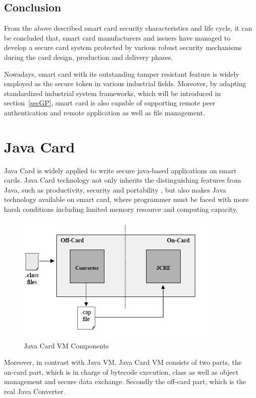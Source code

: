 \subsection {Conclusion}
From the above described smart card security characteristics and life cycle, it can be concluded that, smart card manufacturers and issuers have managed to develop a secure card system protected by various robust security mechanisms during the card design, production and delivery phases.

Nowadays, smart card with its outstanding tamper resistant feature is widely employed as the secure token in various industrial fields. Moreover, by adapting standardized industrial system frameworks, which will be introduced in section~\ref{secGP}, smart card is also capable of supporting remote peer authentication and remote application as well as file management.

\section{Java Card} \label{secJAVACARD}
Java Card is widely applied to write secure java-based applications on smart cards. Java Card technology not only inherits the distinguishing features from Java, such as productivity, security and portability \cite{jcadg}, but also makes Java technology available on smart card, where programmer must be faced with more harsh conditions including limited memory resource and computing capacity.

 \begin{figure}[!htb]
	\centering
	\includegraphics[width=0.9\textwidth]{jcvm.jpg}
		\caption{Java Card VM Components\cite{jcadg}}
	\label{fig:jcvm}
\end{figure}

Moreover, in contrast with Java VM, Java Card VM consists of two parts, the on-card part, which is in charge of bytecode execution, class as well as object management and secure data exchange. Secondly the off-card part, which is the real Java Converter.

